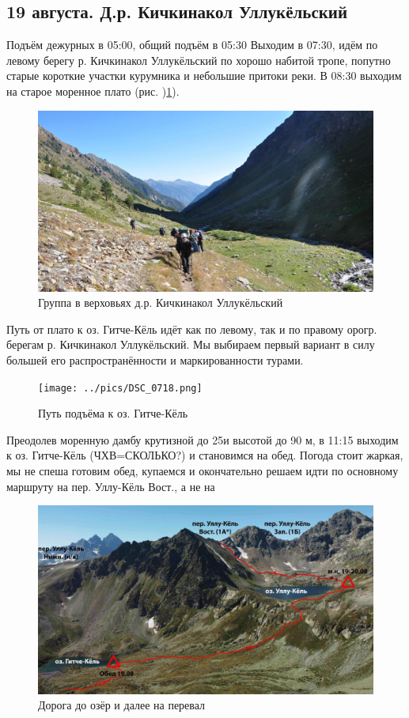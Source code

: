 \subsection{19 августа. Д.р. Кичкинакол Уллукёльский}

Подъём дежурных в 05:00, общий подъём в 05:30 
Выходим в 07:30, идём по левому берегу р. Кичкинакол Уллукёльский по хорошо набитой тропе, попутно  старые короткие участки курумника и небольшие притоки реки. В 08:30 выходим на старое моренное плато (рис. )\ref{fig:DSC_0692}).

\begin{figure}[h]
	\centering
	\includegraphics[width=0.7\linewidth]{../pics/DSC_0692}
	\caption{Группа в верховьях д.р. Кичкинакол Уллукёльский}
	\label{fig:DSC_0692}
\end{figure}

Путь от плато к оз. Гитче-Кёль идёт как по левому, так и по правому орогр. берегам р. Кичкинакол Уллукёльский. Мы выбираем первый вариант в силу большей его распространённости и маркированности турами. 

\begin{figure}[h]
	\centering
	\texttt{[image: ../pics/DSC\_0718.png]}
	\caption{Путь подъёма к оз. Гитче-Кёль}
	\label{fig:DSC_0718}
\end{figure}

Преодолев моренную дамбу крутизной до 25\degree и высотой до 90 м, в 11:15 выходим к оз. Гитче-Кёль (ЧХВ=\alert{СКОЛЬКО?}) и становимся на обед. 
Погода стоит жаркая, мы не спеша готовим обед, купаемся и окончательно решаем идти по основному маршруту на пер. Уллу-Кёль Вост., а не на 


\begin{figure}[h]
	\centering
	\includegraphics[width=0.7\linewidth]{../pics/ullu_kuel_route}
	\caption{Дорога до озёр и далее на перевал}
	\label{fig:ullu_kuel_route}
\end{figure}

